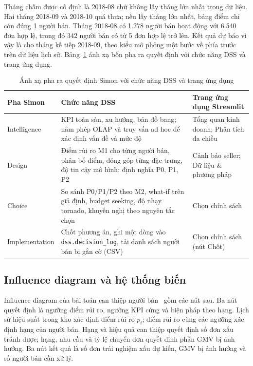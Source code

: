\documentclass[a4paper]{article}
\begin{document}
Tháng chấm được cố định là 2018-08 chứ không lấy tháng lớn nhất trong dữ liệu. Hai tháng 2018-09 và 2018-10 quá thưa; nếu lấy tháng lớn nhất, bảng điểm chỉ còn đúng 1 người bán. Tháng 2018-08 có 1.278 người bán hoạt động với 6.540 đơn hợp lệ, trong đó 342 người bán có từ 5 đơn hợp lệ trở lên. Kết quả dự báo vì vậy là cho tháng kế tiếp 2018-09, theo kiểu mô phỏng một bước về phía trước trên dữ liệu lịch sử. Bảng~\ref{tab:simon_app_map} ánh xạ bốn pha ra quyết định với chức năng DSS và trang ứng dụng.

\begin{table}[htbp]
\centering
\footnotesize
\setlength{\tabcolsep}{3pt}
\renewcommand{\arraystretch}{1.08}
\caption{Ánh xạ pha ra quyết định Simon với chức năng DSS và trang ứng dụng}
\label{tab:simon_app_map}
\begin{tabularx}{\textwidth}{@{}>{\raggedright\arraybackslash}p{2.3cm}>{\raggedright\arraybackslash}X>{\raggedright\arraybackslash}p{4.2cm}@{}}
\toprule
\textbf{Pha Simon} & \textbf{Chức năng DSS} & \textbf{Trang ứng dụng Streamlit} \\
\midrule
Intelligence & KPI toàn sàn, xu hướng, bản đồ bang; năm phép OLAP và truy vấn ad hoc để xác định vấn đề và mức độ & Tổng quan kinh doanh; Phân tích đa chiều \\
\addlinespace
Design & Điểm rủi ro M1 cho từng người bán, phân bố điểm, đóng góp từng đặc trưng, độ tin cậy mô hình; định nghĩa P0, P1, P2 & Cảnh báo seller; Dữ liệu \& phương pháp \\
\addlinespace
Choice & So sánh P0/P1/P2 theo M2, what-if trên giả định, budget seeking, độ nhạy tornado, khuyến nghị theo nguyên tắc chọn & Chọn chính sách \\
\addlinespace
Implementation & Chốt phương án, ghi một dòng vào \texttt{dss.\allowbreak{}decision\_\allowbreak{}log}, tải danh sách người bán bị gắn cờ (CSV) & Chọn chính sách (nút Chốt) \\
\bottomrule
\end{tabularx}
\end{table}

\subsection{Influence diagram và hệ thống biến}
\label{subsec:5_4}

Influence diagram của bài toán can thiệp người bán~\cite{bib:turban_dss} gồm các nút sau. Ba nút quyết định là ngưỡng điểm rủi ro, ngưỡng KPI cứng và biện pháp theo hạng. Lịch sử hiệu suất trong kho xác định điểm rủi ro $p_i$; điểm rủi ro cùng các ngưỡng xác định hạng của người bán. Hạng và hiệu quả can thiệp quyết định số đơn xấu tránh được; hạng, nhu cầu và tỷ lệ chuyển đơn quyết định phần GMV bị ảnh hưởng. Ba nút kết quả là số đơn trải nghiệm xấu dự kiến, GMV bị ảnh hưởng và số người bán cần xử lý.
\end{document}
